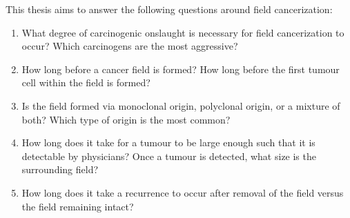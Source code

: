 \documentclass[\main/thesis.tex]{subfiles}
\begin{document}
This thesis aims to answer the following questions around field cancerization:
\begin{enumerate}
    \item What degree of carcinogenic onslaught is necessary for field cancerization to occur? Which carcinogens are the most aggressive?
    \item How long before a cancer field is formed? How long before the first tumour cell within the field is formed?
    \item Is the field formed via monoclonal origin, polyclonal origin, or a mixture of both? Which type of origin is the most common?
    \item How long does it take for a tumour to be large enough such that it is detectable by physicians? Once a tumour is detected, what size is the surrounding field?
    \item How long does it take a recurrence to occur after removal of the field versus the field remaining intact?
\end{enumerate}
\end{document}
